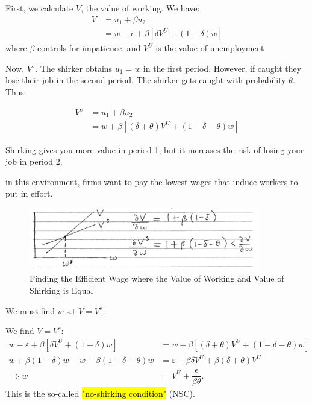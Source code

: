 \documentclass[11pt]{article}
\begin{document}
\begin{deriv}
    First, we calculate $V$, the value of working. We have:
    \begin{align*}
        V &= u_1 + \beta u_2 \\
        &= w - \epsilon + \beta\left[\delta V^U + (1-\delta)w\right]
    \end{align*}
    where $\beta$ controls for impatience. and $V^U$ is the value of unemployment

    Now, $V^s$. The shirker obtains $u_1 = w$ in the first period. However, if caught they lose their job in the second period. The shirker gets caught with probability $\theta$. Thus:

    \begin{align*}
        V^s &= u_1 + \beta u_2 \\
        &= w + \beta\left[(\delta+\theta)V^U + (1-\delta-\theta)w\right]
    \end{align*}
\end{deriv}
\begin{intu}
    Shirking gives you more value in period 1, but it increases the risk of losing your job in period 2.
\end{intu}

in this environment, firms want to pay the lowest wages that induce workers to put in effort.

\begin{figure}[h]
    \centering
    \includegraphics[width=10cm]{photos/v and v shirk.png}
    \caption{Finding the Efficient Wage where the Value of Working and Value of Shirking is Equal}
    \label{fig:efficient wage}
\end{figure}

We must find $w$ s.t $V=V^s$.

\begin{deriv}
We find $V=V^s$:
    \begin{equation}
    \label{derivation of efficient wage}
    \begin{aligned}
    w-\varepsilon+\beta\left[\delta V^U+(1-\delta) w\right]&=w+\beta\left[(\delta+\theta) V^U+(1-\delta-\theta) w\right] \\
    w+\beta(1-\delta) w-w-\beta(1-\delta-\theta) w&=\varepsilon-\beta \delta V^U+\beta(\delta+\theta) V^U \\
    \Rightarrow w &= V^U + \dfrac{\epsilon}{\beta\theta}.
\end{aligned}
\end{equation}
This is the so-called \hl{"no-shirking condition"} (NSC).
\end{deriv}
\end{document}
